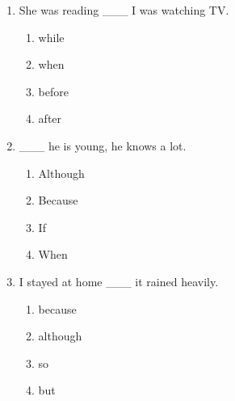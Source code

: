 \documentclass[11pt,a4paper]{ctexart}
\begin{document}
\begin{enumerate}[leftmargin=*,itemsep=4pt]
\begin{enumerate}[label=\Alph*.,leftmargin=2em,itemsep=1pt,topsep=2pt]
\item because
\item though
\end{enumerate}
\item She was reading \_\_\_ I was watching TV.
\begin{enumerate}[label=\Alph*.,leftmargin=2em,itemsep=1pt,topsep=2pt]
\item while
\item when
\item before
\item after
\end{enumerate}
\item \_\_\_ he is young, he knows a lot.
\begin{enumerate}[label=\Alph*.,leftmargin=2em,itemsep=1pt,topsep=2pt]
\item Although
\item Because
\item If
\item When
\end{enumerate}
\item I stayed at home \_\_\_ it rained heavily.
\begin{enumerate}[label=\Alph*.,leftmargin=2em,itemsep=1pt,topsep=2pt]
\item because
\item although
\item so
\item but
\end{enumerate}
\end{enumerate}
\end{document}
